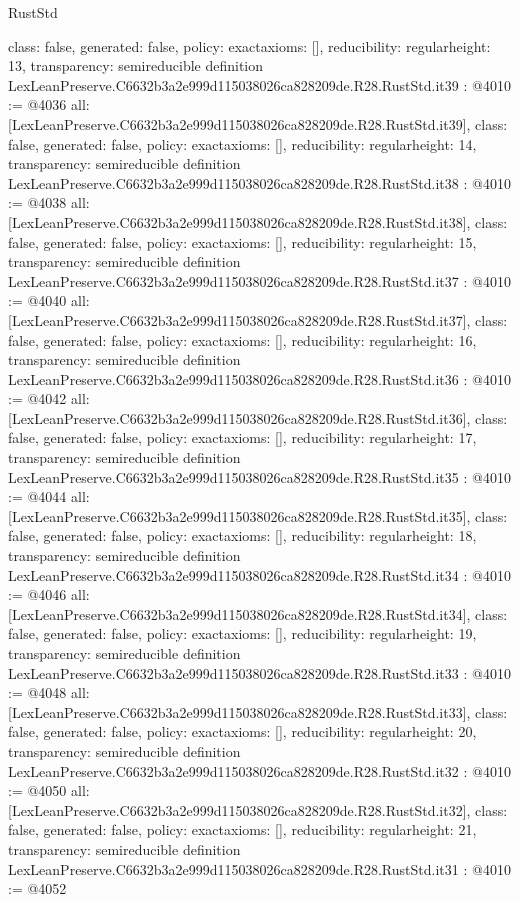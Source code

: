 \begin{lexlean}{RustStd}
\begin{coremodule}
{  class: false,
  generated: false,
  policy: exact{axioms: []},
  reducibility: regular{height: 13},
  transparency: semireducible
}
definition LexLeanPreserve.C6632b3a2e999d115038026ca828209de.R28.RustStd.it39 : @4010 := @4036 {
  all: [LexLeanPreserve.C6632b3a2e999d115038026ca828209de.R28.RustStd.it39],
  class: false,
  generated: false,
  policy: exact{axioms: []},
  reducibility: regular{height: 14},
  transparency: semireducible
}
definition LexLeanPreserve.C6632b3a2e999d115038026ca828209de.R28.RustStd.it38 : @4010 := @4038 {
  all: [LexLeanPreserve.C6632b3a2e999d115038026ca828209de.R28.RustStd.it38],
  class: false,
  generated: false,
  policy: exact{axioms: []},
  reducibility: regular{height: 15},
  transparency: semireducible
}
definition LexLeanPreserve.C6632b3a2e999d115038026ca828209de.R28.RustStd.it37 : @4010 := @4040 {
  all: [LexLeanPreserve.C6632b3a2e999d115038026ca828209de.R28.RustStd.it37],
  class: false,
  generated: false,
  policy: exact{axioms: []},
  reducibility: regular{height: 16},
  transparency: semireducible
}
definition LexLeanPreserve.C6632b3a2e999d115038026ca828209de.R28.RustStd.it36 : @4010 := @4042 {
  all: [LexLeanPreserve.C6632b3a2e999d115038026ca828209de.R28.RustStd.it36],
  class: false,
  generated: false,
  policy: exact{axioms: []},
  reducibility: regular{height: 17},
  transparency: semireducible
}
definition LexLeanPreserve.C6632b3a2e999d115038026ca828209de.R28.RustStd.it35 : @4010 := @4044 {
  all: [LexLeanPreserve.C6632b3a2e999d115038026ca828209de.R28.RustStd.it35],
  class: false,
  generated: false,
  policy: exact{axioms: []},
  reducibility: regular{height: 18},
  transparency: semireducible
}
definition LexLeanPreserve.C6632b3a2e999d115038026ca828209de.R28.RustStd.it34 : @4010 := @4046 {
  all: [LexLeanPreserve.C6632b3a2e999d115038026ca828209de.R28.RustStd.it34],
  class: false,
  generated: false,
  policy: exact{axioms: []},
  reducibility: regular{height: 19},
  transparency: semireducible
}
definition LexLeanPreserve.C6632b3a2e999d115038026ca828209de.R28.RustStd.it33 : @4010 := @4048 {
  all: [LexLeanPreserve.C6632b3a2e999d115038026ca828209de.R28.RustStd.it33],
  class: false,
  generated: false,
  policy: exact{axioms: []},
  reducibility: regular{height: 20},
  transparency: semireducible
}
definition LexLeanPreserve.C6632b3a2e999d115038026ca828209de.R28.RustStd.it32 : @4010 := @4050 {
  all: [LexLeanPreserve.C6632b3a2e999d115038026ca828209de.R28.RustStd.it32],
  class: false,
  generated: false,
  policy: exact{axioms: []},
  reducibility: regular{height: 21},
  transparency: semireducible
}
definition LexLeanPreserve.C6632b3a2e999d115038026ca828209de.R28.RustStd.it31 : @4010 := @4052 {
}
\end{coremodule}
\end{lexlean}
